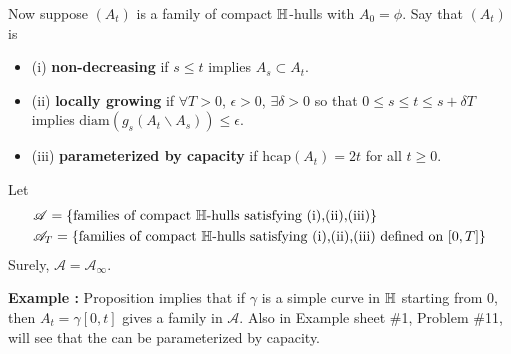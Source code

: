 \documentclass[12pt,a4paper]{article}
\renewenvironment{i}
{\begin{itemize} 
	}%
	{\end{itemize}
}
\begin{document}
 Now suppose $(A_t)$ is a family of compact $\mathbb{H}$-hulls with $A_0 = \phi$. Say that $(A_t)$ is
\begin{i}
\item[(i)] \textbf{non-decreasing} if $s\leq t$ implies $A_s\subset A_t$.
\item[(ii)] \textbf{locally growing} if $\forall T>0$, $\epsilon >0$, $\exists \delta >0$ so that $0\leq s\leq t \leq s+\delta T$ implies $\text{diam}(g_s (A_t \backslash A_s))\leq \epsilon$.
\item[(iii)] \textbf{parameterized by capacity} if $\text{hcap}(A_t)=2t$ for all $t\geq 0$.
\end{i}
Let 
\begin{align*}
&\mathscr{A} = \{\text{families of compact } \mathbb{H}\text{-hulls satisfying (i),(ii),(iii)} \} \\
&\mathscr{A}_T = \{\text{families of compact } \mathbb{H}\text{-hulls satisfying (i),(ii),(iii) defined on }[0,T] \}
\end{align*}
Surely, $\mathscr{A} = \mathscr{A}_{\infty}$.
\s

\textbf{Example :} Proposition implies that if $\gamma$ is a simple curve in $\mathbb{H}$ starting from 0, then $A_{t} = \gamma [0,t]$ gives a family in $\mathscr{A}$. Also in Example sheet \#1, Problem \#11, will see that the can be parameterized by capacity.
\s
\end{document}

